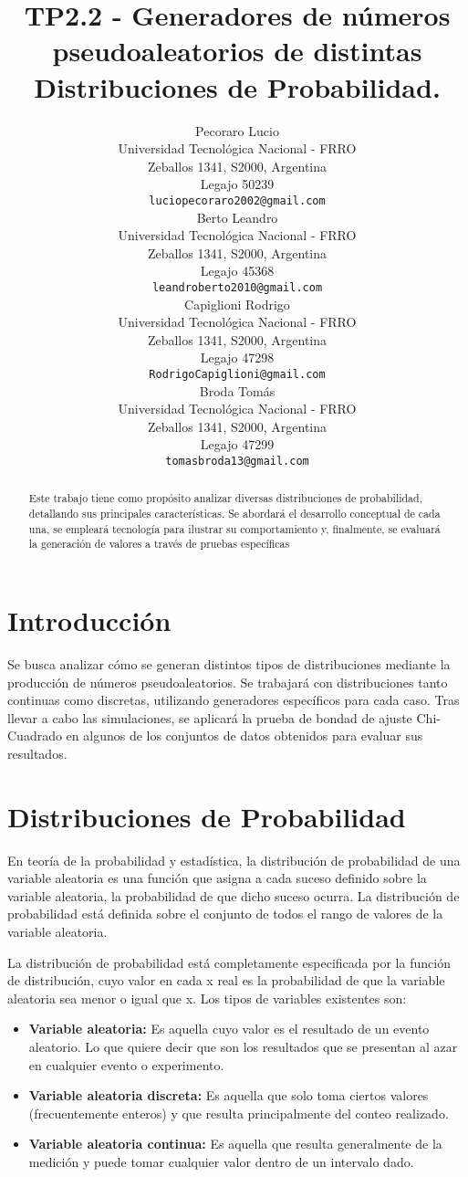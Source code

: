 \documentclass[11pt]{article}
\title{TP2.2 - Generadores de números pseudoaleatorios de distintas Distribuciones de Probabilidad.}
\author{
 Pecoraro Lucio \\
  Universidad Tecnológica Nacional - FRRO\\
  Zeballos 1341, S2000, Argentina\\
  Legajo 50239 \\
  \texttt{luciopecoraro2002@gmail.com} \\
   \And
 Berto Leandro \\
  Universidad Tecnológica Nacional - FRRO\\
  Zeballos 1341, S2000, Argentina\\
  Legajo 45368 \\
  \texttt{leandroberto2010@gmail.com} \\
  \And
 Capiglioni Rodrigo \\
  Universidad Tecnológica Nacional - FRRO\\
  Zeballos 1341, S2000, Argentina\\
  Legajo 47298 \\
  \texttt{RodrigoCapiglioni@gmail.com} \\
  \And
  Broda Tomás \\
  Universidad Tecnológica Nacional - FRRO\\
  Zeballos 1341, S2000, Argentina\\
  Legajo 47299 \\
  \texttt{tomasbroda13@gmail.com} \\
  }
\begin{document}
\maketitle

\begin{abstract}
Este trabajo tiene como propósito analizar diversas distribuciones de probabilidad, detallando sus principales características. Se abordará el desarrollo conceptual de cada una, se empleará tecnología para ilustrar su comportamiento y, finalmente, se evaluará la generación de valores a través de pruebas específicas\end{abstract}

\section{Introducción}
Se busca analizar cómo se generan distintos tipos de distribuciones mediante la producción de números pseudoaleatorios. Se trabajará con distribuciones tanto continuas como discretas, utilizando generadores específicos para cada caso. Tras llevar a cabo las simulaciones, se aplicará la prueba de bondad de ajuste Chi-Cuadrado en algunos de los conjuntos de datos obtenidos para evaluar sus resultados.

\section{Distribuciones de Probabilidad}
En teoría de la probabilidad y estadística, la distribución de probabilidad de una variable aleatoria es una función que asigna a cada suceso definido sobre la variable aleatoria, la probabilidad de que dicho suceso ocurra. La distribución de probabilidad está definida sobre el conjunto de todos el rango de valores de la variable aleatoria.

La distribución de probabilidad está completamente especificada por la función de distribución, cuyo valor en cada x real es la probabilidad de que la variable aleatoria sea menor o igual que x. Los tipos de variables existentes son:

\begin{itemize}
    \item\textbf{Variable aleatoria:} Es aquella cuyo valor es el resultado de un evento aleatorio. Lo que quiere decir que son los resultados que se presentan al azar en cualquier evento o experimento.
    \item\textbf{Variable aleatoria discreta:} Es aquella que solo toma ciertos valores (frecuentemente enteros) y que resulta principalmente del conteo realizado.
    \item\textbf{Variable aleatoria continua:} Es aquella que resulta generalmente de la medición y puede tomar cualquier valor dentro de un intervalo dado.

\end{itemize}
\end{document}
